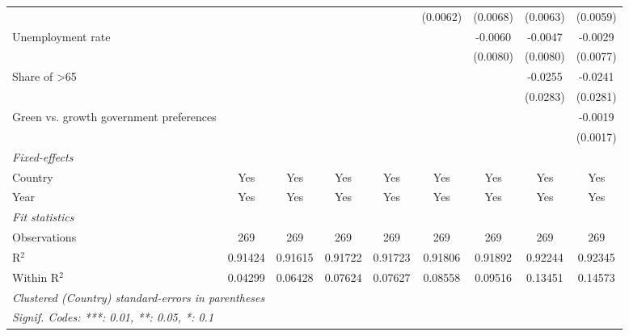 \begin{table}[htbp]
\begin{tabular}{lcccccccc}
                                                               &               &               &              &              & (0.0062)      & (0.0068)      & (0.0063)       & (0.0059)\\   
      Unemployment rate                                        &               &               &              &              &               & -0.0060       & -0.0047        & -0.0029\\   
                                                               &               &               &              &              &               & (0.0080)      & (0.0080)       & (0.0077)\\   
      Share of >65                                             &               &               &              &              &               &               & -0.0255        & -0.0241\\   
                                                               &               &               &              &              &               &               & (0.0283)       & (0.0281)\\   
      Green vs. growth government preferences                  &               &               &              &              &               &               &                & -0.0019\\   
                                                               &               &               &              &              &               &               &                & (0.0017)\\   
      \midrule
      \emph{Fixed-effects}\\
      Country                                                  & Yes           & Yes           & Yes          & Yes          & Yes           & Yes           & Yes            & Yes\\  
      Year                                                     & Yes           & Yes           & Yes          & Yes          & Yes           & Yes           & Yes            & Yes\\  
      \midrule
      \emph{Fit statistics}\\
      Observations                                             & 269           & 269           & 269          & 269          & 269           & 269           & 269            & 269\\  
      R$^2$                                                    & 0.91424       & 0.91615       & 0.91722      & 0.91723      & 0.91806       & 0.91892       & 0.92244        & 0.92345\\  
      Within R$^2$                                             & 0.04299       & 0.06428       & 0.07624      & 0.07627      & 0.08558       & 0.09516       & 0.13451        & 0.14573\\  
      \midrule \midrule
      \multicolumn{9}{l}{\emph{Clustered (Country) standard-errors in parentheses}}\\
      \multicolumn{9}{l}{\emph{Signif. Codes: ***: 0.01, **: 0.05, *: 0.1}}\\
   \end{tabular}
\end{table}


